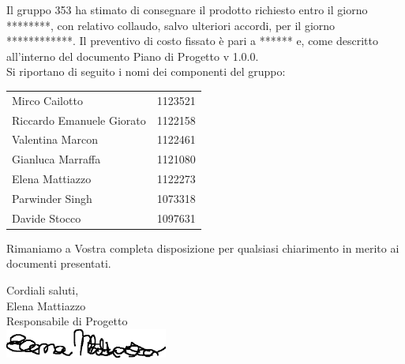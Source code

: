 \documentclass[openany, a4paper, 12pt]{letter}
\begin{document}
\begin{letter}
			Il gruppo 353 ha stimato di consegnare il prodotto richiesto entro il giorno ********,
			con relativo collaudo, salvo ulteriori accordi, per il giorno ************. Il preventivo di costo
			fissato è pari a ****** e, come descritto all'interno del documento Piano di Progetto v 1.0.0.%
			\medskip \\
			Si riportano di seguito i nomi dei componenti del gruppo:\\
			\begin{center}
				\begin{tabular}{|l r|}
					Mirco Cailotto & 1123521\\
					Riccardo Emanuele Giorato & 1122158\\
					Valentina Marcon & 1122461\\
					Gianluca Marraffa & 1121080\\
					Elena Mattiazzo & 1122273\\
					Parwinder Singh & 1073318\\
					Davide Stocco & 1097631\\
				\end{tabular}
			\end{center}
		Rimaniamo a Vostra completa disposizione per qualsiasi chiarimento in merito ai documenti presentati.
		\begin{flushleft}
		Cordiali saluti,\\
		Elena Mattiazzo\\
		Responsabile di Progetto\\
		\includegraphics[width=0.4\textwidth]{firmaResp}
		\end{flushleft}
		\end{letter}
	
\end{document}

